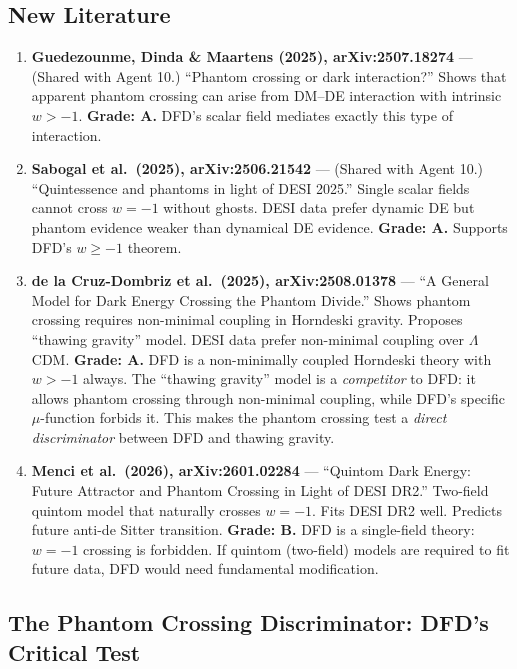 \documentclass[11pt,a4paper]{article}
\begin{document}
\subsection{New Literature}

\begin{enumerate}

\item \textbf{Guedezounme, Dinda \& Maartens (2025), arXiv:2507.18274} --- (Shared with Agent 10.) ``Phantom crossing or dark interaction?'' Shows that apparent phantom crossing can arise from DM--DE interaction with intrinsic $w > -1$. \textbf{Grade: A.} DFD's scalar field mediates exactly this type of interaction.

\item \textbf{Sabogal et al.\ (2025), arXiv:2506.21542} --- (Shared with Agent 10.) ``Quintessence and phantoms in light of DESI 2025.'' Single scalar fields cannot cross $w = -1$ without ghosts. DESI data prefer dynamic DE but phantom evidence weaker than dynamical DE evidence. \textbf{Grade: A.} Supports DFD's $w \geq -1$ theorem.

\item \textbf{de la Cruz-Dombriz et al.\ (2025), arXiv:2508.01378} --- ``A General Model for Dark Energy Crossing the Phantom Divide.'' Shows phantom crossing requires non-minimal coupling in Horndeski gravity. Proposes ``thawing gravity'' model. DESI data prefer non-minimal coupling over $\Lambda$CDM. \textbf{Grade: A.} DFD is a non-minimally coupled Horndeski theory with $w > -1$ always. The ``thawing gravity'' model is a \emph{competitor} to DFD: it allows phantom crossing through non-minimal coupling, while DFD's specific $\mu$-function forbids it. This makes the phantom crossing test a \emph{direct discriminator} between DFD and thawing gravity.

\item \textbf{Menci et al.\ (2026), arXiv:2601.02284} --- ``Quintom Dark Energy: Future Attractor and Phantom Crossing in Light of DESI DR2.'' Two-field quintom model that naturally crosses $w = -1$. Fits DESI DR2 well. Predicts future anti-de Sitter transition. \textbf{Grade: B.} DFD is a single-field theory: $w = -1$ crossing is forbidden. If quintom (two-field) models are required to fit future data, DFD would need fundamental modification.

\end{enumerate}

\subsection{The Phantom Crossing Discriminator: DFD's Critical Test}
\end{document}

